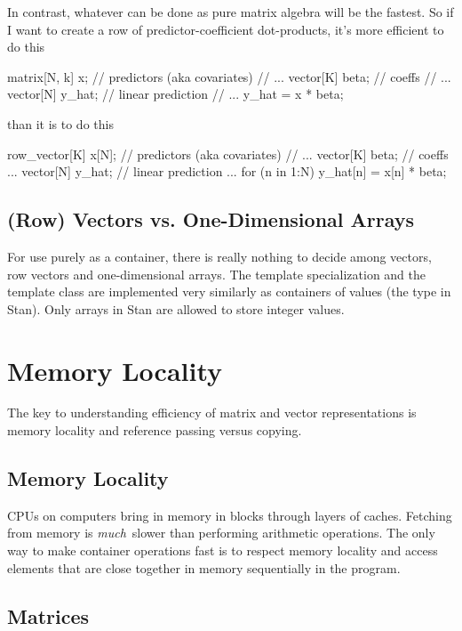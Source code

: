 In contrast, whatever can be done as pure matrix algebra will be the
fastest.  So if I want to create a row of predictor-coefficient
dot-products, it's more efficient to do this
%
\begin{stancode}
matrix[N, k] x;    // predictors (aka covariates)
// ...
vector[K] beta;   // coeffs
// ...
vector[N] y_hat;  // linear prediction
// ...
y_hat = x * beta;
\end{stancode}
%
than it is to do this
%
\begin{stancode}
row_vector[K] x[N];    // predictors (aka covariates)
// ...
vector[K] beta;   // coeffs
...
vector[N] y_hat;  // linear prediction
...
for (n in 1:N)
  y_hat[n] = x[n] * beta;
\end{stancode}

\subsection{(Row) Vectors vs. One-Dimensional Arrays}

For use purely as a container, there is really nothing to decide among
vectors, row vectors and one-dimensional arrays.  The
 template specialization and the
 template class are implemented very similarly as
containers of  values (the type  in Stan).
Only arrays in Stan are allowed to store integer values.


\section{Memory Locality}

The key to understanding efficiency of matrix and vector
representations is memory locality and reference passing versus
copying.

\subsection{Memory Locality}

CPUs on computers bring in memory in blocks through layers of caches.
Fetching from memory is \emph{much}\ slower than performing arithmetic
operations.  The only way to make container operations fast is to
respect memory locality and access elements that are close together in
memory sequentially in the program.

\subsection{Matrices}


